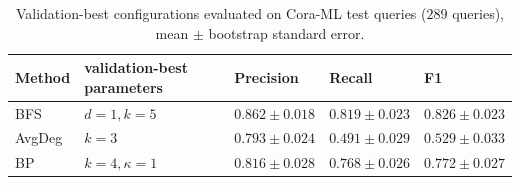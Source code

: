 \begin{table}[H]
  \centering
  \scriptsize
  \caption{Validation-best configurations evaluated on Cora-ML test queries ($289$ queries), mean $\pm$ bootstrap standard error.}
  \label{tab:test}
  \begin{tabular}{lllll}
    \toprule
    Method & validation-best parameters & Precision & Recall & F1 \\
    \midrule
    BFS & $d=1, k=5$ & $0.862\pm0.018$ & $0.819\pm0.023$ & $0.826\pm0.023$ \\
    AvgDeg & $k=3$ & $0.793\pm0.024$ & $0.491\pm0.029$ & $0.529\pm0.033$ \\
    BP & $k=4, \kappa=1$ & $0.816\pm0.028$ & $0.768\pm0.026$ & $0.772\pm0.027$ \\
    \bottomrule
  \end{tabular}
\end{table}
